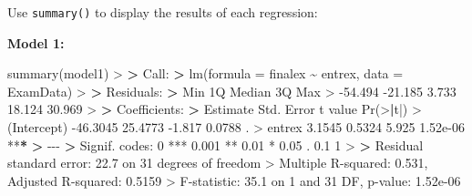 \documentclass[
]{book}
\newenvironment{Shaded}{\begin{snugshade}}{\end{snugshade}}
\newcommand{\AttributeTok}[1]{\textcolor[rgb]{0.77,0.63,0.00}{#1}}
\newcommand{\DecValTok}[1]{\textcolor[rgb]{0.00,0.00,0.81}{#1}}
\newcommand{\ErrorTok}[1]{\textcolor[rgb]{0.64,0.00,0.00}{\textbf{#1}}}
\newcommand{\FloatTok}[1]{\textcolor[rgb]{0.00,0.00,0.81}{#1}}
\newcommand{\FunctionTok}[1]{\textcolor[rgb]{0.00,0.00,0.00}{#1}}
\newcommand{\NormalTok}[1]{#1}
\newcommand{\SpecialCharTok}[1]{\textcolor[rgb]{0.00,0.00,0.00}{#1}}
\newcommand{\StringTok}[1]{\textcolor[rgb]{0.31,0.60,0.02}{#1}}
\theoremstyle{definition}
\theoremstyle{definition}
\theoremstyle{definition}
\theoremstyle{definition}
\theoremstyle{remark}
\begin{document}
\hfill\break
Use \texttt{summary()} to display the results of each regression:

\textbf{Model 1:}

\begin{Shaded}
\begin{Highlighting}[]
\FunctionTok{summary}\NormalTok{(model1)}
\SpecialCharTok{\textgreater{}} 
\ErrorTok{\textgreater{}}\NormalTok{ Call}\SpecialCharTok{:}
\ErrorTok{\textgreater{}} \FunctionTok{lm}\NormalTok{(}\AttributeTok{formula =}\NormalTok{ finalex }\SpecialCharTok{\textasciitilde{}}\NormalTok{ entrex, }\AttributeTok{data =}\NormalTok{ ExamData)}
\SpecialCharTok{\textgreater{}} 
\ErrorTok{\textgreater{}}\NormalTok{ Residuals}\SpecialCharTok{:}
\ErrorTok{\textgreater{}}\NormalTok{     Min      1Q  Median      3Q     Max }
\SpecialCharTok{\textgreater{}} \SpecialCharTok{{-}}\FloatTok{54.494} \SpecialCharTok{{-}}\FloatTok{21.185}   \FloatTok{3.733}  \FloatTok{18.124}  \FloatTok{30.969} 
\SpecialCharTok{\textgreater{}} 
\ErrorTok{\textgreater{}}\NormalTok{ Coefficients}\SpecialCharTok{:}
\ErrorTok{\textgreater{}}\NormalTok{             Estimate Std. Error t value }\FunctionTok{Pr}\NormalTok{(}\SpecialCharTok{\textgreater{}}\ErrorTok{|}\NormalTok{t}\SpecialCharTok{|}\NormalTok{)    }
\SpecialCharTok{\textgreater{}}\NormalTok{ (Intercept) }\SpecialCharTok{{-}}\FloatTok{46.3045}    \FloatTok{25.4773}  \SpecialCharTok{{-}}\FloatTok{1.817}   \FloatTok{0.0788}\NormalTok{ .  }
\SpecialCharTok{\textgreater{}}\NormalTok{ entrex        }\FloatTok{3.1545}     \FloatTok{0.5324}   \FloatTok{5.925} \FloatTok{1.52e{-}06} \SpecialCharTok{**}\ErrorTok{*}
\ErrorTok{\textgreater{}} \SpecialCharTok{{-}{-}{-}}
\ErrorTok{\textgreater{}}\NormalTok{ Signif. codes}\SpecialCharTok{:}  \DecValTok{0} \StringTok{\textquotesingle{}***\textquotesingle{}} \FloatTok{0.001} \StringTok{\textquotesingle{}**\textquotesingle{}} \FloatTok{0.01} \StringTok{\textquotesingle{}*\textquotesingle{}} \FloatTok{0.05} \StringTok{\textquotesingle{}.\textquotesingle{}} \FloatTok{0.1} \StringTok{\textquotesingle{} \textquotesingle{}} \DecValTok{1}
\SpecialCharTok{\textgreater{}} 
\ErrorTok{\textgreater{}}\NormalTok{ Residual standard error}\SpecialCharTok{:} \FloatTok{22.7}\NormalTok{ on }\DecValTok{31}\NormalTok{ degrees of freedom}
\SpecialCharTok{\textgreater{}}\NormalTok{ Multiple R}\SpecialCharTok{{-}}\NormalTok{squared}\SpecialCharTok{:}  \FloatTok{0.531}\NormalTok{,   Adjusted R}\SpecialCharTok{{-}}\NormalTok{squared}\SpecialCharTok{:}  \FloatTok{0.5159} 
\SpecialCharTok{\textgreater{}}\NormalTok{ F}\SpecialCharTok{{-}}\NormalTok{statistic}\SpecialCharTok{:}  \FloatTok{35.1}\NormalTok{ on }\DecValTok{1}\NormalTok{ and }\DecValTok{31}\NormalTok{ DF,  p}\SpecialCharTok{{-}}\NormalTok{value}\SpecialCharTok{:} \FloatTok{1.52e{-}06}
\end{Highlighting}
\end{Shaded}
\end{document}
